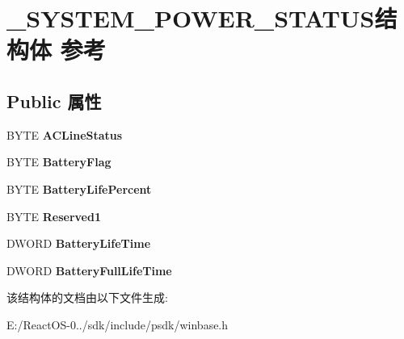 \hypertarget{struct___s_y_s_t_e_m___p_o_w_e_r___s_t_a_t_u_s}{}\section{\+\_\+\+S\+Y\+S\+T\+E\+M\+\_\+\+P\+O\+W\+E\+R\+\_\+\+S\+T\+A\+T\+U\+S结构体 参考}
\label{struct___s_y_s_t_e_m___p_o_w_e_r___s_t_a_t_u_s}
\subsection*{Public 属性}
\begin{DoxyCompactItemize}
\item 
\mbox{\label{struct___s_y_s_t_e_m___p_o_w_e_r___s_t_a_t_u_s_a7ebd9b203fab2d5713453e18535bc7fa}} 
B\+Y\+TE {\bfseries A\+C\+Line\+Status}
\item 
\mbox{\label{struct___s_y_s_t_e_m___p_o_w_e_r___s_t_a_t_u_s_a988b38cba9a6a1f8a462bd0f580eb6ce}} 
B\+Y\+TE {\bfseries Battery\+Flag}
\item 
\mbox{\label{struct___s_y_s_t_e_m___p_o_w_e_r___s_t_a_t_u_s_a1dd942720c503a3ff44d07ff1c1ed67f}} 
B\+Y\+TE {\bfseries Battery\+Life\+Percent}
\item 
\mbox{\label{struct___s_y_s_t_e_m___p_o_w_e_r___s_t_a_t_u_s_a6541fbe1d2d133ced87ee869e52774cd}} 
B\+Y\+TE {\bfseries Reserved1}
\item 
\mbox{\label{struct___s_y_s_t_e_m___p_o_w_e_r___s_t_a_t_u_s_a66c529bb8e30fbf854e617424eb50c74}} 
D\+W\+O\+RD {\bfseries Battery\+Life\+Time}
\item 
\mbox{\label{struct___s_y_s_t_e_m___p_o_w_e_r___s_t_a_t_u_s_a43caf85910b48b2bc5dbb5dfe608163a}} 
D\+W\+O\+RD {\bfseries Battery\+Full\+Life\+Time}
\end{DoxyCompactItemize}


该结构体的文档由以下文件生成\+:\begin{DoxyCompactItemize}
\item 
E\+:/\+React\+O\+S-\/0../sdk/include/psdk/winbase.\+h\end{DoxyCompactItemize}
